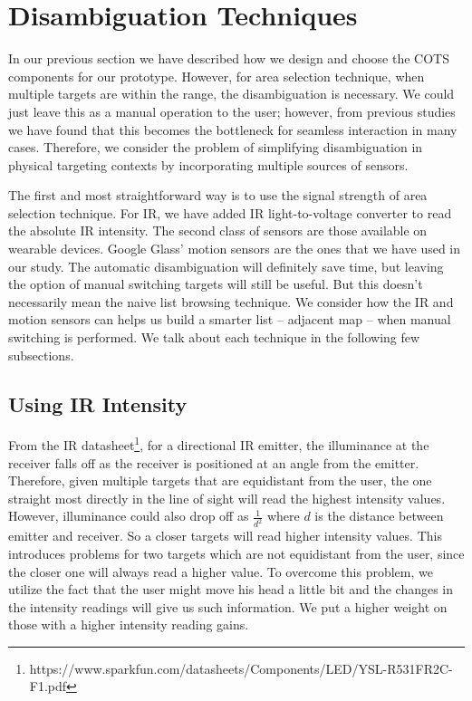 \section{Disambiguation Techniques}
\label{sec:disamb-techn}

In our previous section we have described how we design and choose the COTS components for our prototype. However, for area selection technique, when multiple targets are within the range, the disambiguation is necessary. We could just leave this as a manual operation to the user; however, from previous studies \cite{Chen:EECS-2013-200} we have found that this becomes the bottleneck for seamless interaction in many cases. Therefore, we consider the problem of simplifying disambiguation in physical targeting contexts by incorporating multiple sources of sensors. 

The first and most straightforward way is to use the signal strength of area selection technique. For IR, we have added IR light-to-voltage converter to read the absolute IR intensity. The second class of sensors are those available on wearable devices. Google Glass' motion sensors are the ones that we have used in our study. The automatic disambiguation will definitely save time, but leaving the option of manual switching targets will still be useful. But this doesn't necessarily mean the naive list browsing technique. We consider how the IR and motion sensors can helps us build a smarter list -- adjacent map -- when manual switching is performed. We talk about each technique in the following few subsections. 

\subsection{Using IR Intensity}
\label{sec:using-ir-intensity}

From the IR datasheet\footnote{https://www.sparkfun.com/datasheets/Components/LED/YSL-R531FR2C-F1.pdf}, for a directional IR emitter, the illuminance at the receiver falls off as the receiver is positioned at an angle from the emitter. Therefore, given multiple targets that are equidistant from the user, the one straight most directly in the line of sight will read the highest intensity values. However, illuminance could also drop off as $\frac{1}{d^2}$ where $d$ is the distance between emitter and receiver. So a closer targets will read higher intensity values. This introduces problems for two targets which are not equidistant from the user, since the closer one will always read a higher value. To overcome this problem, we utilize the fact that the user might move his head a little bit and the changes in the intensity readings will give us such information. We put a higher weight on those with a higher intensity reading gains.

